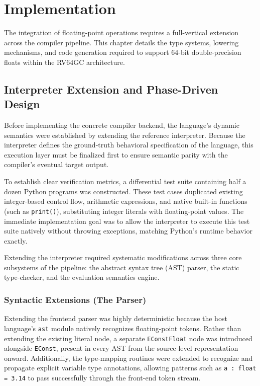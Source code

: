 \chapter{Implementation}\label{chap:implementation}

The integration of floating-point operations requires a full-vertical extension across the compiler pipeline. This chapter details the type systems, lowering mechanisms, and code generation required to support 64-bit double-precision floats within the RV64GC architecture.

\section{Interpreter Extension and Phase-Driven Design}

Before implementing the concrete compiler backend, the language's dynamic semantics were established by extending the reference interpreter. Because the interpreter defines the ground-truth behavioral specification of the language, this execution layer must be finalized first to ensure semantic parity with the compiler's eventual target output.

To establish clear verification metrics, a differential test suite containing half a dozen Python programs was constructed. These test cases duplicated existing integer-based control flow, arithmetic expressions, and native built-in functions (such as \texttt{print()}), substituting integer literals with floating-point values. The immediate implementation goal was to allow the interpreter to execute this test suite natively without throwing exceptions, matching Python's runtime behavior exactly.

Extending the interpreter required systematic modifications across three core subsystems of the pipeline: the abstract syntax tree (AST) parser, the static type-checker, and the evaluation semantics engine.

\subsection{Syntactic Extensions (The Parser)}
Extending the frontend parser was highly deterministic because the host language's \texttt{ast} module natively recognizes floating-point tokens. Rather than extending the existing literal node, a separate \texttt{EConstFloat} node was introduced alongside \texttt{EConst}, present in every AST from the source-level representation onward. Additionally, the type-mapping routines were extended to recognize and propagate explicit variable type annotations, allowing patterns such as \texttt{a : float = 3.14} to pass successfully through the front-end token stream.

